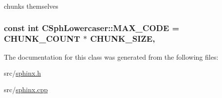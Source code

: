 chunks themselves 

\hypertarget{classCSphLowercaser_ae93306949e3408ffa9f31be79c42f1be}{
\subsubsection[{M\-A\-X\-\_\-\-C\-O\-D\-E}]{\setlength{\rightskip}{0pt plus 5cm}const {\bf int} C\-Sph\-Lowercaser\-::\-M\-A\-X\-\_\-\-C\-O\-D\-E = {\bf C\-H\-U\-N\-K\-\_\-\-C\-O\-U\-N\-T} $\ast$ {\bf C\-H\-U\-N\-K\-\_\-\-S\-I\-Z\-E}\hspace{0.3cm}{\ttfamily [static]}, {\ttfamily [protected]}}}\label{classCSphLowercaser_ae93306949e3408ffa9f31be79c42f1be}


The documentation for this class was generated from the following files\-:\begin{DoxyCompactItemize}
\item 
src/\hyperlink{sphinx_8h}{sphinx.\-h}\item 
src/\hyperlink{sphinx_8cpp}{sphinx.\-cpp}\end{DoxyCompactItemize}
